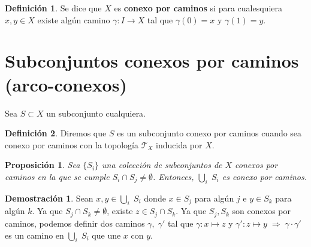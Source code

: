 \documentclass[12pt,twoside]{report}
\newcommand\mc[1]{\mathcal{#1}}
\theoremstyle{azul}
\theoremstyle{azul2}
\theoremstyle{plain}
\newtheorem*{prop}{Proposición}
\theoremstyle{definition}
\newtheorem*{defi}{Definición}
\newtheorem*{dem}{Demostración}
\theoremstyle{remark}
\begin{document}
\begin{defi}
Se dice que $X$ es \textbf{conexo por caminos} si para cualesquiera $x,y \in X$ existe alg{\'u}n camino $\gamma: I \longrightarrow X$ tal que $\gamma(0)=x$ y $\gamma(1)=y$.
\end{defi}


\section{Subconjuntos conexos por caminos (arco-conexos)}
Sea $S\subset X$ un subconjunto cualquiera.
\begin{defi}
Diremos que $S$ es un subconjunto conexo por caminos cuando sea conexo por caminos con la topología $\mc{T}_X$ inducida por $X$.
\end{defi}

\begin{prop}
Sea $\{ S_i \}$ una colección de subconjuntos de $X$ conexos por caminos en la que se cumple $S_i \cap S_j \neq \emptyset$. Entonces, $\underset{i}{\bigcup} \; S_i$ es conexo por caminos.
\end{prop}
\begin{dem}
Sean $x,y \in \underset{i}{\bigcup} \; S_i$ donde $x \in S_j$ para alg{\'u}n $j$ e $y \in S_k$ para alg{\'u}n $k$. Ya que $S_j \cap S_k \neq \emptyset$, existe $z \in S_j \cap S_k$. Ya que $S_j, S_k$ son conexos por caminos, podemos definir dos caminos $\gamma, \; \gamma'$ tal que $\gamma: x \longmapsto z$ y $\gamma': z \longmapsto y \; \Rightarrow \; \gamma \cdot \gamma' $ es un camino en $ \underset{i}{\bigcup} \; S_i$ que une $x$ con $y$. 
\end{dem}
\end{document}
